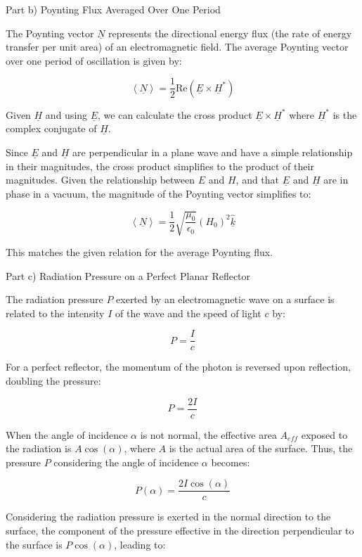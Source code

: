Part b) Poynting Flux Averaged Over One Period

The Poynting vector \(\underline{N}\) represents the directional energy flux (the rate of energy transfer per unit area) of an electromagnetic field. The average Poynting vector over one period of oscillation is given by:

\[
\left< \underline{N} \right> = \frac{1}{2} \text{Re}(\underline{E} \times \underline{H}^*)
\]

Given \(\underline{H}\) and using \(\underline{E}\), we can calculate the cross product \(\underline{E} \times \underline{H}^*\) where \(\underline{H}^*\) is the complex conjugate of \(\underline{H}\).

Since \(\underline{E}\) and \(\underline{H}\) are perpendicular in a plane wave and have a simple relationship in their magnitudes, the cross product simplifies to the product of their magnitudes. Given the relationship between \(E\) and \(H\), and that \(\underline{E}\) and \(\underline{H}\) are in phase in a vacuum, the magnitude of the Poynting vector simplifies to:

\[
\left< \underline{N} \right> = \frac{1}{2} \sqrt{\frac{\mu_{0}}{\epsilon_{0}}} (H_{0})^{2} \hat{\underline{k}}
\]

This matches the given relation for the average Poynting flux.

Part c) Radiation Pressure on a Perfect Planar Reflector

The radiation pressure \( P\) exerted by an electromagnetic wave on a surface is related to the intensity \(I\) of the wave and the speed of light \(c\) by:

\[
P = \frac{I}{c}
\]

For a perfect reflector, the momentum of the photon is reversed upon reflection, doubling the pressure:

\[
P = \frac{2I}{c}
\]

When the angle of incidence \(\alpha\) is not normal, the effective area \(A_{eff}\) exposed to the radiation is \(A\cos(\alpha)\), where \(A\) is the actual area of the surface. Thus, the pressure \(P\) considering the angle of incidence \(\alpha\) becomes:

\[
P(\alpha) = \frac{2I\cos(\alpha)}{c}
\]

Considering the radiation pressure is exerted in the normal direction to the surface, the component of the pressure effective in the direction perpendicular to the surface is \(P\cos(\alpha)\), leading to:


